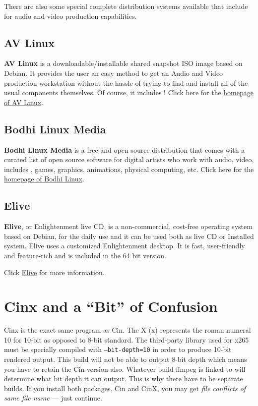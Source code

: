 There are also some special complete distribution systems
available that include \CGG{} for audio and video production
capabilities.

\subsection{AV Linux}
\label{sec:AV_Linux}

\textbf{AV Linux} is a downloadable/installable shared snapshot
ISO image based on Debian.  It provides the user an easy method to
get an Audio and Video production workstation without the hassle
of trying to find and install all of the usual components
themselves.  Of course, it includes \CGG{}!
%
Click here for the
\href{http://www.bandshed.net/avlinux/}{homepage of AV Linux}.

\subsection{Bodhi Linux Media}
\label{sec:Bodhi_Linux}

\textbf{Bodhi Linux Media} is a free and open source distribution that
comes with a curated list of open source software for digital
artists who work with audio, video, includes \CGG{}, games,
graphics, animations, physical computing, etc.
%
Click here for the
\href{https://gitlab.com/giuseppetorre/bodhilinuxmedia}{homepage of Bodhi Linux}.

\subsection{Elive}
\label{sec:elive}

\textbf{Elive}, or Enlightenment live CD, is a non-commercial, cost-free operating system based on Debian, for the daily use and it can be used both as live CD or Installed system. Elive uses a customized Enlightenment desktop. It is fast, user-friendly and feature-rich and \CGG{} is included in the 64 bit version.

Click \href{https://www.elivecd.org/}{Elive} for more information.

\section{Cinx and a “Bit” of Confusion}%
\label{sec:cinx_and_a_bit_of_confusion}

Cinx is the exact same program as Cin.  The X (x) represents the
roman numeral 10 for 10-bit as opposed to 8-bit standard.  The
third-party library used for x265 must be specially compiled with
\texttt{--bit-depth=10} in order to produce 10-bit rendered
output.
%
This build will not be able to output 8-bit depth which means you
have to retain the Cin version also.
%
Whatever build ffmpeg is linked to will determine what bit depth
it can output.  This is why there have to be separate builds.  If
you install both packages, Cin and CinX, you may get \textit{file
  conflicts of same file name} --- just continue.

